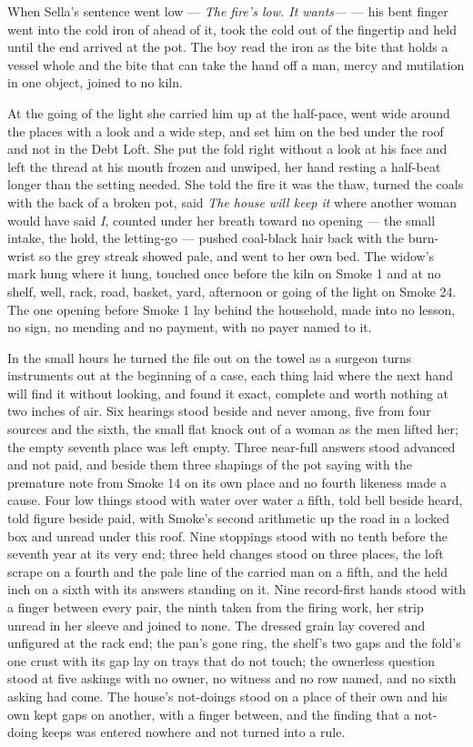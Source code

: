 When Sella's sentence went low --- \emph{The fire's low. It wants---} --- his bent finger went into the cold iron of  ahead of it, took the cold out of the fingertip and held until the end arrived at the pot. The boy read the iron as the bite that holds a vessel whole and the bite that can take the hand off a man, mercy and mutilation in one object, joined to no kiln.

\scenebreak

At the going of the light she carried him up at the half-pace, went wide around the places with a look and a wide step, and set him on the bed under the roof and not in the Debt Loft. She put the fold right without a look at his face and left the thread at his mouth frozen and unwiped, her hand resting a half-beat longer than the setting needed. She told the fire it was the thaw, turned the coals with the back of a broken pot, said \emph{The house will keep it} where another woman would have said \emph{I}, counted under her breath toward no opening --- the small intake, the hold, the letting-go --- pushed coal-black hair back with the burn-wrist so the grey streak showed pale, and went to her own bed. The widow's mark hung where it hung, touched once before the kiln on Smoke 1 and at no shelf, well, rack, road, basket, yard, afternoon or going of the light on Smoke 24. The one opening before Smoke 1 lay behind the household, made into no lesson, no sign, no mending and no payment, with no payer named to it.

In the small hours he turned the file out on the towel as a surgeon turns instruments out at the beginning of a case, each thing laid where the next hand will find it without looking, and found it exact, complete and worth nothing at two inches of air. Six hearings stood beside and never among, five from four sources and the sixth, the small flat knock out of a woman as the men lifted her; the empty seventh place was left empty. Three near-full answers stood advanced and not paid, and beside them three shapings of the pot saying with the premature note from Smoke 14 on its own place and no fourth likeness made a cause. Four low things stood with water over water a fifth, told bell beside heard, told figure beside paid, with Smoke's second arithmetic up the road in a locked box and unread under this roof. Nine stoppings stood with no tenth before the seventh year at its very end; three held changes stood on three places, the loft scrape on a fourth and the pale line of the carried man on a fifth, and the held inch on a sixth with its answers standing on it. Nine record-first hands stood with a finger between every pair, the ninth taken from the firing work, her strip unread in her sleeve and joined to none. The dressed grain lay covered and unfigured at the rack end; the pan's gone ring, the shelf's two gaps and the fold's one crust with its gap lay on trays that do not touch; the ownerless question stood at five askings with no owner, no witness and no row named, and no sixth asking had come. The house's not-doings stood on a place of their own and his own kept gaps on another, with a finger between, and the finding that a not-doing keeps was entered nowhere and not turned into a rule.

